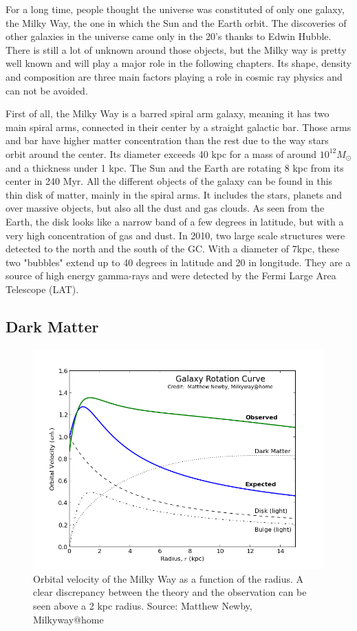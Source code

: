 For a long time, people thought the universe was constituted of only one galaxy, the Milky Way, the one in which the Sun and the Earth orbit. The discoveries of other galaxies in the universe came only in the 20's thanks to Edwin Hubble. There is still a lot of unknown  around those objects, but the Milky way is pretty well known and will play a major role in the following chapters. Its shape, density and composition are three main factors playing a role in cosmic ray physics and can not be avoided.

First of all, the Milky Way is a barred spiral arm galaxy, meaning it has two main spiral arms, connected in their center by a straight galactic bar. Those arms and bar have higher matter concentration than the rest due to the way stars orbit around the center. Its diameter exceeds 40 kpc for a mass of around $10^{12} M_\odot$ and a thickness under 1 kpc. The Sun and the Earth are rotating 8 kpc from its center in 240 Myr.
All the different objects of the galaxy can be found in this thin disk of matter, mainly in the spiral arms. It includes the stars, planets and over massive objects, but also all the dust and gas clouds. As seen from the Earth, the disk looks like a narrow band of a few degrees in latitude, but with a very high concentration of gas and dust.
In 2010, two large scale structures were detected to the north and the south of the GC. With a diameter of 7kpc, these two "bubbles" extend up to 40 degrees in latitude and 20 in longitude. They are a source of high energy gamma-rays and were detected by the Fermi Large Area Telescope (LAT).


\subsection{Dark Matter}

\begin{figure}[h]
 \centering
 \includegraphics[width=.5\linewidth]{pic/theory/gal_rotation_curve.png}
 \caption{Orbital velocity of the Milky Way as a function of the radius. A clear discrepancy between the theory and the observation can be seen above a 2 kpc radius. Source: Matthew Newby, Milkyway@home}
 \label{fig:gal_rotation_curve}
\end{figure}


